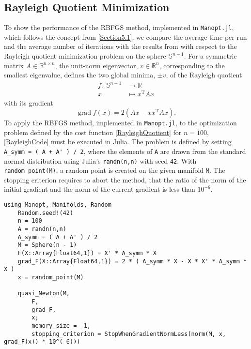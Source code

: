 \subsection{Rayleigh Quotient Minimization}
\label{Section5.2.1}

To show the performance of the RBFGS method, implemented in \lstinline!Manopt.jl!, which follows the concept from \cref{Section5.1}, we compare the average time per run and the average number of iterations with the results from \cite[p.~84]{Qi:2011} with respect to the Rayleigh quotient minimization problem on the sphere $\mathbb{S}^{n-1}$. For a symmetric matrix $A \in \mathbb{R}^{n \times n}$, the unit-norm eigenvector, $v \in \mathbb{R}^n$, corresponding to the smallest eigenvalue, defines the two global minima, $\pm v$, of the Rayleigh quotient  
\begin{equation}\label{RayleighQuotient}
    \begin{split}
        f \colon \; \mathbb{S}^{n-1} & \to \mathbb{R} \\
        x & \mapsto x^{\mathrm{T}} A x 
    \end{split}
\end{equation}   
with its gradient 
\begin{equation*}
    \operatorname{grad} f(x) = 2(Ax - x x^{\mathrm{T}} A x).
\end{equation*}
To apply the RBFGS method, implemented in \lstinline!Manopt.jl!, to the optimization problem defined by the cost function \cref{RayleighQuotient} for $n=100$, \cref{RayleighCode} must be executed in Julia. The problem is defined by setting \lstinline!A_symm = ( A + A' ) / 2!, where the elements of \lstinline!A! are drawn from the standard normal distribution using Julia’s \lstinline!randn(n,n)! with seed \lstinline!42!. With \lstinline!random_point(M)!, a random point is created on the given manifold \lstinline!M!. The stopping criterion requires to abort the method, that the ratio of the norm of the initial gradient and the norm of the current gradient is less than $10^{-6}$.\\ 

\begin{lstlisting}[caption={The Rayleigh quotient minimization experiment in Julia for $n = 100$.}, label={RayleighCode}]
    using Manopt, Manifolds, Random
    Random.seed!(42)
    n = 100
    A = randn(n,n)
    A_symm = ( A + A' ) / 2
    M = Sphere(n - 1)
    F(X::Array{Float64,1}) = X' * A_symm * X
    grad_F(X::Array{Float64,1}) = 2 * ( A_symm * X - X * X' * A_symm * X )
    x = random_point(M)
    
    quasi_Newton(M, 
        F, 
        grad_F, 
        x; 
        memory_size = -1, 
        stopping_criterion = StopWhenGradientNormLess(norm(M, x, grad_F(x)) * 10^(-6))) 
\end{lstlisting}

